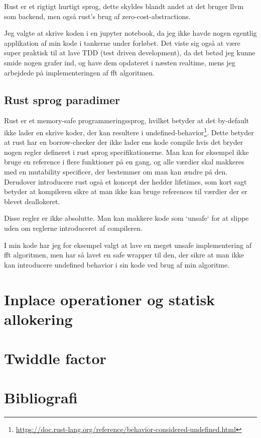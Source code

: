 \documentclass[11pt,a4paper]{article}
\begin{document}
Rust er et rigtigt hurtigt sprog, dette skyldes blandt andet at det bruger llvm som backend,
men også rust's brug af zero-cost-abstractions.

Jeg valgte at skrive koden i en jupyter notebook, da jeg ikke havde nogen egentlig
applikation af min kode i tankerne under forløbet.
Det viste sig også at være super praktisk til at lave TDD (test driven development),
da det betød jeg kunne smide nogen grafer ind, og have dem opdateret i næsten realtime,
mens jeg arbejdede på implementeringen af fft algoritmen.

\subsection{Rust sprog paradimer}
\label{sec:org2ddd545}
Rust er et memory-safe programmeringssprog,
hvilket betyder at det by-default ikke lader en skrive koder, der kan resultere i undefined-behavior\footnote{\url{https://doc.rust-lang.org/reference/behavior-considered-undefined.html}}.
Dette betyder at rust har en borrow-checker der ikke lader ens kode compile hvis det bryder nogen regler defineret i rust sprog specifikationerne.
Man kan for eksempel ikke bruge en reference i flere funktioner på en gang, og alle værdier skal makkeres med
en mutability specificer, der bestemmer om man kan ændre på den. Derudover introducere rust også et koncept der hedder lifetimes,
som kort sagt betyder at kompileren sikre at man ikke kan bruge references til værdier der er blevet deallokeret.

\bigskip

Disse regler er ikke absolutte. Man kan makkere kode som `unsafe` for at slippe uden om reglerne introduceret af compileren.

I min kode har jeg for eksempel valgt at lave en meget unsafe implementering af fft algoritmen,
men har så lavet en safe wrapper til den, der sikre at man ikke kan introducere undefined behavior i sin kode ved brug af min algoritme.

\section{Inplace operationer og statisk allokering}
\label{sec:orge890615}

\section{Twiddle factor}
\label{sec:orgce4c477}

\section{Bibliografi}
\label{sec:orgd48cad2}
\end{document}
